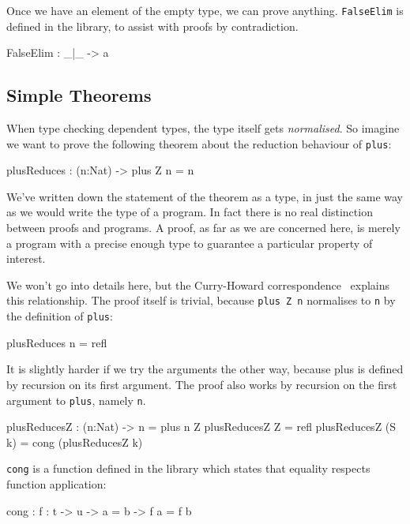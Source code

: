 Once we have an element of the empty type, we can prove anything.
\texttt{FalseElim} is defined in the library, to assist with proofs by contradiction.

\begin{code}
FalseElim : _|_ -> a
\end{code} 

\subsection{Simple Theorems}

When type checking dependent types, the type itself gets \emph{normalised}.
So imagine we want to prove the following theorem about the reduction behaviour of \texttt{plus}:

\begin{code}
plusReduces : (n:Nat) -> plus Z n = n
\end{code}

\noindent
We've written down the statement of the theorem as a type, in just the same way as we would write the type of a program.
In fact there is no real distinction between proofs and programs.
A proof, as far as we are concerned here, is merely a program with a precise enough type to guarantee a particular property of interest.

We won't go into details here, but the Curry-Howard correspondence~\cite{howard} explains this relationship.
The proof itself is trivial, because \texttt{plus Z n} normalises to \texttt{n} by the definition of \texttt{plus}:

\begin{code}
plusReduces n = refl
\end{code}

\noindent
It is slightly harder if we try the arguments the other way, because plus is defined by recursion on its first argument.
The proof also works by recursion on the first argument to \texttt{plus}, namely \texttt{n}.

\begin{code}
plusReducesZ : (n:Nat) -> n = plus n Z
plusReducesZ Z = refl
plusReducesZ (S k) = cong (plusReducesZ k)
\end{code}

\noindent
\texttt{cong} is a function defined in the library which states that equality respects function application:

\begin{code}
cong : {f : t -> u} -> a = b -> f a = f b
\end{code}

